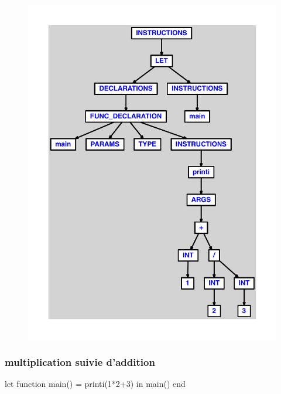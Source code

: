 \documentclass{article}
\begin{document}
\begin{figure}[H]\centering\includegraphics[max width=\textwidth]{ast/ast_46.pdf}\end{figure}\subsubsection{multiplication suivie d'addition}
\begin{verbatimtab}
let
	function main() = printi(1*2+3)
in main() end
\end{verbatimtab}
\end{document}
